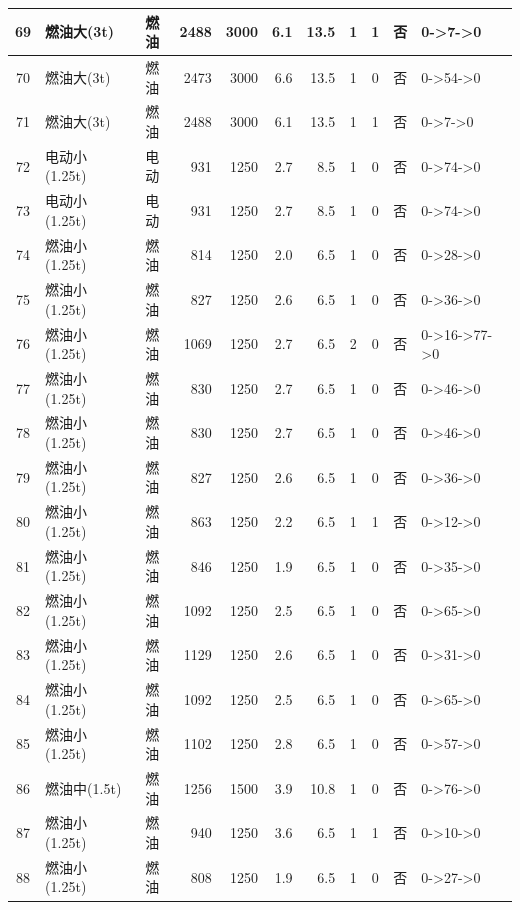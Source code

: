 \begin{landscape}
\begin{longtable}{|c|l|c|r|r|r|r|c|c|c|p{2.8cm}|}
\hline
\rowcolor{gray!8}
69 & 燃油大(3t) & 燃油 & 2488 & 3000 & 6.1 & 13.5 & 1 & 1 & 否 & 0->7->0 \\
\hline
70 & 燃油大(3t) & 燃油 & 2473 & 3000 & 6.6 & 13.5 & 1 & 0 & 否 & 0->54->0 \\
\hline
\rowcolor{gray!8}
71 & 燃油大(3t) & 燃油 & 2488 & 3000 & 6.1 & 13.5 & 1 & 1 & 否 & 0->7->0 \\
\hline
72 & 电动小(1.25t) & 电动 & 931 & 1250 & 2.7 & 8.5 & 1 & 0 & 否 & 0->74->0 \\
\hline
\rowcolor{gray!8}
73 & 电动小(1.25t) & 电动 & 931 & 1250 & 2.7 & 8.5 & 1 & 0 & 否 & 0->74->0 \\
\hline
74 & 燃油小(1.25t) & 燃油 & 814 & 1250 & 2.0 & 6.5 & 1 & 0 & 否 & 0->28->0 \\
\hline
\rowcolor{gray!8}
75 & 燃油小(1.25t) & 燃油 & 827 & 1250 & 2.6 & 6.5 & 1 & 0 & 否 & 0->36->0 \\
\hline
76 & 燃油小(1.25t) & 燃油 & 1069 & 1250 & 2.7 & 6.5 & 2 & 0 & 否 & 0->16->77->0 \\
\hline
\rowcolor{gray!8}
77 & 燃油小(1.25t) & 燃油 & 830 & 1250 & 2.7 & 6.5 & 1 & 0 & 否 & 0->46->0 \\
\hline
78 & 燃油小(1.25t) & 燃油 & 830 & 1250 & 2.7 & 6.5 & 1 & 0 & 否 & 0->46->0 \\
\hline
\rowcolor{gray!8}
79 & 燃油小(1.25t) & 燃油 & 827 & 1250 & 2.6 & 6.5 & 1 & 0 & 否 & 0->36->0 \\
\hline
80 & 燃油小(1.25t) & 燃油 & 863 & 1250 & 2.2 & 6.5 & 1 & 1 & 否 & 0->12->0 \\
\hline
\rowcolor{gray!8}
81 & 燃油小(1.25t) & 燃油 & 846 & 1250 & 1.9 & 6.5 & 1 & 0 & 否 & 0->35->0 \\
\hline
82 & 燃油小(1.25t) & 燃油 & 1092 & 1250 & 2.5 & 6.5 & 1 & 0 & 否 & 0->65->0 \\
\hline
\rowcolor{gray!8}
83 & 燃油小(1.25t) & 燃油 & 1129 & 1250 & 2.6 & 6.5 & 1 & 0 & 否 & 0->31->0 \\
\hline
84 & 燃油小(1.25t) & 燃油 & 1092 & 1250 & 2.5 & 6.5 & 1 & 0 & 否 & 0->65->0 \\
\hline
\rowcolor{gray!8}
85 & 燃油小(1.25t) & 燃油 & 1102 & 1250 & 2.8 & 6.5 & 1 & 0 & 否 & 0->57->0 \\
\hline
86 & 燃油中(1.5t) & 燃油 & 1256 & 1500 & 3.9 & 10.8 & 1 & 0 & 否 & 0->76->0 \\
\hline
\rowcolor{gray!8}
87 & 燃油小(1.25t) & 燃油 & 940 & 1250 & 3.6 & 6.5 & 1 & 1 & 否 & 0->10->0 \\
\hline
88 & 燃油小(1.25t) & 燃油 & 808 & 1250 & 1.9 & 6.5 & 1 & 0 & 否 & 0->27->0 \\

\end{longtable}
\end{landscape}
